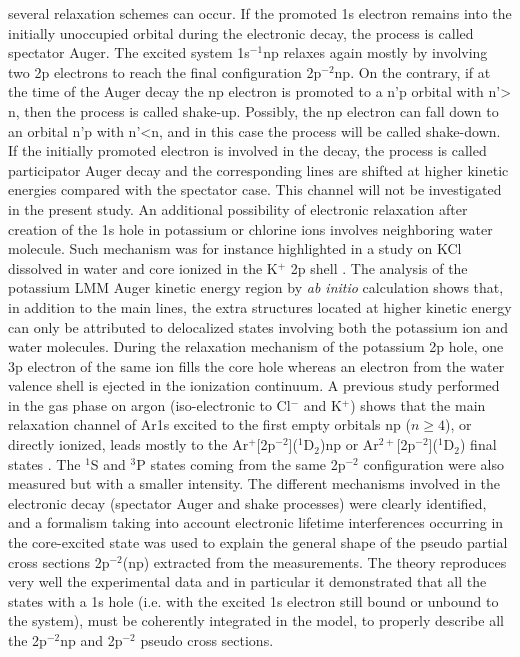 several relaxation schemes can occur. If the promoted 1s electron remains into the initially unoccupied orbital during the electronic decay, the process is called spectator Auger. The excited system 1s$^{-1}$np relaxes again mostly by involving two 2p electrons to reach the final configuration 2p$^{-2}$np. On the contrary, if at the time of the Auger decay the np electron is promoted to a n’p orbital with n’> n, then the process is called shake-up. Possibly, the np electron can fall down to an orbital n’p with n’<n, and in this case the process will be called shake-down. If the initially promoted electron is involved in the decay, the process is called participator Auger decay and the corresponding lines are shifted at higher kinetic energies compared with the spectator case. This channel will not be investigated in the present study. An additional possibility of electronic relaxation after creation of the 1s hole in potassium or chlorine ions involves neighboring water molecule. Such mechanism was for instance highlighted in a study on KCl dissolved in water and core ionized in the K$^{+}$ 2p shell \citep{Pokapanich09:7264}. The analysis of the potassium LMM Auger kinetic energy region by {\it ab initio} calculation shows that, in addition to the main lines, the extra structures located at higher kinetic energy can only be attributed to delocalized states involving both the potassium ion and water molecules. During the relaxation mechanism of the potassium 2p hole, one 3p electron of the same ion fills the core hole whereas an electron from the water valence shell is ejected in the ionization continuum. A previous study performed in the gas phase on argon (iso-electronic to Cl$^{-}$ and K$^{+}$) shows that the main relaxation channel of Ar1s excited to the first empty orbitals np ($n\geq4$), or directly ionized, leads mostly to the Ar$^+$[2p$^{-2}$]($^{1}$D$_{2}$)np or Ar$^{2+}$[2p$^{-2}$]($^{1}$D$_{2}$) final states \citep{ceolin15:022502}. The $^1$S and $^3$P states coming from the same 2p$^{-2}$ configuration were also measured but with a smaller intensity. The different mechanisms involved in the electronic decay (spectator Auger and shake processes) were clearly identified, and a formalism taking into account electronic lifetime interferences occurring in the core-excited state was used to explain the general shape of the pseudo partial cross sections 2p$^{-2}$(np) extracted from the measurements. The theory reproduces very well the experimental data and in particular it demonstrated that all the states with a 1s hole (i.e. with the excited 1s electron still bound or unbound to the system), must be coherently integrated in the model, to properly describe all the 2p$^{-2}$np and 2p$^{-2}$ pseudo cross sections. 


